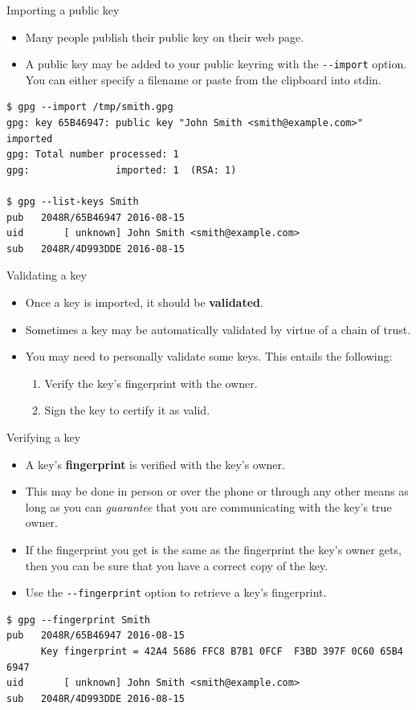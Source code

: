 \documentclass[
mode=present,
paper=smartboard,
size=20pt,
]{powerdot}
\newcommand\vsp{\vspace{-16mm}}
\newcommand{\clopt}[1]{\texttt{{-}#1}}
\begin{document}
\begin{slide}[method=direct]{Importing a public key}
  \begin{itemize}
  \item Many people publish their public key on their web page.
  \item A public key may be added to your public keyring with the
    \clopt{-import} option. You can either specify a filename or paste
    from the clipboard into stdin.
  \end{itemize}
\begin{verbatim}
$ gpg --import /tmp/smith.gpg
gpg: key 65B46947: public key "John Smith <smith@example.com>" imported
gpg: Total number processed: 1
gpg:               imported: 1  (RSA: 1)

$ gpg --list-keys Smith
pub   2048R/65B46947 2016-08-15
uid       [ unknown] John Smith <smith@example.com>
sub   2048R/4D993DDE 2016-08-15
\end{verbatim}
\end{slide}

\begin{slide}{Validating a key}
  \begin{itemize}
  \item Once a key is imported, it should be \textbf{validated}.
  \item Sometimes a key may be automatically validated by virtue of a
    chain of trust.
  \item You may need to personally validate some keys.  This entails
    the following:
    \begin{enumerate}
    \item Verify the key's fingerprint with the owner.
    \item Sign the key to certify it as valid.
    \end{enumerate}
  \end{itemize}
\end{slide}

\begin{slide}[method=direct]{Verifying a key}
  \begin{itemize}
  \item A key's \textbf{fingerprint} is verified with the key's owner.
  \item This may be done in person or over the phone or through any
    other means as long as you can \emph{guarantee} that you are
    communicating with the key's true owner.
  \item If the fingerprint you get is the same as the fingerprint the
    key's owner gets, then you can be sure that you have a correct
    copy of the key.
  \item Use the \clopt{-fingerprint} option to retrieve a key's
    fingerprint.
  \end{itemize}
\vsp
\begin{verbatim}
$ gpg --fingerprint Smith
pub   2048R/65B46947 2016-08-15
      Key fingerprint = 42A4 5686 FFC8 B7B1 0FCF  F3BD 397F 0C60 65B4 6947
uid       [ unknown] John Smith <smith@example.com>
sub   2048R/4D993DDE 2016-08-15
\end{verbatim}
\end{slide}
\end{document}
